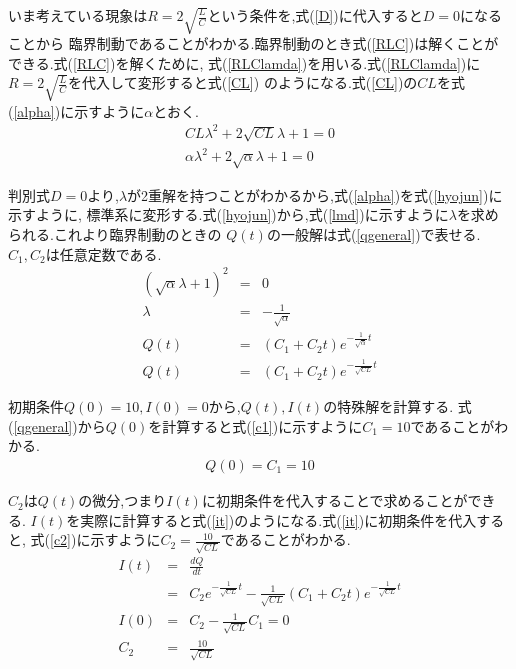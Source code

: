 \documentclass[a4j]{jarticle}
\begin{document}
        いま考えている現象は$R=2\sqrt{\frac{L}{C}}$という条件を,式(\ref{D})に代入すると$D=0$になることから
        臨界制動であることがわかる.臨界制動のとき式(\ref{RLC})は解くことができる.式(\ref{RLC})を解くために,
        式(\ref{RLClamda})を用いる.式(\ref{RLClamda})に$R=2\sqrt{\frac{L}{C}}$を代入して変形すると式(\ref{CL})
        のようになる.式(\ref{CL})の$CL$を式(\ref{alpha})に示すように$\alpha$とおく.
        \begin{eqnarray}
          CL \lambda^2 +2\sqrt{CL} \lambda + 1=0 \label{CL} \\ 
          \alpha \lambda^2 +2\sqrt{\alpha} \lambda + 1=0 \label{alpha}
        \end{eqnarray}

        判別式$D=0$より,$\lambda$が2重解を持つことがわかるから,式(\ref{alpha})を式(\ref{hyojun})に示すように,
        標準系に変形する.式(\ref{hyojun})から,式(\ref{lmd})に示すように$\lambda$を求められる.これより臨界制動のときの
        $Q(t)$の一般解は式(\ref{qgeneral})で表せる.$C_1,C_2$は任意定数である.
        \begin{eqnarray}
          (\sqrt{\alpha} \lambda +1)^2 &=& 0 \label{hyojun} \\ 
          \lambda &=& -\frac{1}{\sqrt{\alpha}} \label{lmd} \\
          Q(t) &=& (C_1+C_2 t)e^{-\frac{1}{\sqrt{\alpha}}t} \\
          Q(t) &=& (C_1+C_2 t)e^{-\frac{1}{\sqrt{CL}}t} \label{qgeneral} 
        \end{eqnarray}

        初期条件$Q(0)=10,I(0)=0$から,$Q(t),I(t)$の特殊解を計算する.
        式(\ref{qgeneral})から$Q(0)$を計算すると式(\ref{c1})に示すように$C_1=10$であることがわかる.
        \begin{eqnarray}
          Q(0) = C_1 = 10 \label{c1}
        \end{eqnarray}

        $C_2$は$Q(t)$の微分,つまり$I(t)$に初期条件を代入することで求めることができる.
        $I(t)$を実際に計算すると式(\ref{it})のようになる.式(\ref{it})に初期条件を代入すると,
        式(\ref{c2})に示すように$C_2=\frac{10}{\sqrt{CL}}$であることがわかる.
        \begin{eqnarray}
          I(t) &=& \frac{dQ}{dt} \\
               &=& C_2e^{-\frac{1}{\sqrt{CL}}t} -\frac{1}{\sqrt{CL}}(C_1+C_2 t)e^{-\frac{1}{\sqrt{CL}}t} \label{it} \\
          I(0) &=& C_2 -\frac{1}{\sqrt{CL}}C_1 = 0 \\
              C_2 &=& \frac{10}{\sqrt{CL}} \label{c2}
        \end{eqnarray}
\end{document}
